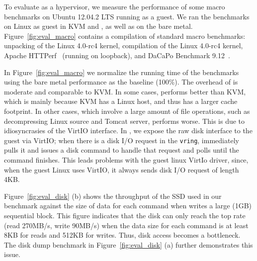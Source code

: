 To evaluate \mCTOShyper{} as a hypervisor, we measure the performance of
some macro benchmarks on Ubuntu 12.04.2 LTS running as a guest.  We ran the
benchmarks on Linux as guest in KVM and \mCTOShyper{}, as well as on the bare metal.
Figure~\ref{fig:eval_macro} contains a compilation of standard macro
benchmarks: unpacking of the Linux 4.0-rc4 kernel, compilation of the
Linux 4.0-rc4 kernel, Apache HTTPerf~\cite{mosberger1998} (running on
loopback), and DaCaPo Benchmark 9.12~\cite{dacapo2006}.


In Figure~\ref{fig:eval_macro} we normalize the running time of the benchmarks
using the bare metal performance as the baseline (100\%). The overhead of
\mCTOShyper{} is moderate and comparable to KVM. In some cases, \mCTOShyper{}
performs better than KVM, which is mainly because KVM has a Linux host, and thus has a
larger cache footprint. In other cases, which involve a large amount of file
operations, such as decompressing Linux source and Tomcat server, \mCTOShyper{}
performs worse. This is due to idiosyncrasies of the VirtIO interface. In
\mCTOShyper{}, we expose the raw disk interface to the guest via VirtIO; when
there is a disk I/O request in the \texttt{vring}, \mCTOShyper{} immediately
pulls it and issues a disk command to handle that request and polls until the
command finishes. This leads problems with the guest linux VirtIo driver, since,
when the guest Linux uses VirtIO, it always sends disk I/O request of length
4KB.

Figure~\ref{fig:eval_disk} (b) shows the throughput of the SSD used in our
benchmark against the size of data for each command when writes a large (1GB)
sequential block. This figure indicates that the disk can only reach the top
rate (read 270MB/s, write 90MB/s) when the data size for each command is at
least 8KB for reads and 512KB for writes.
Thus, disk access becomes a bottleneck.
The disk dump benchmark in Figure~\ref{fig:eval_disk} (a)
further demonstrates this issue.


